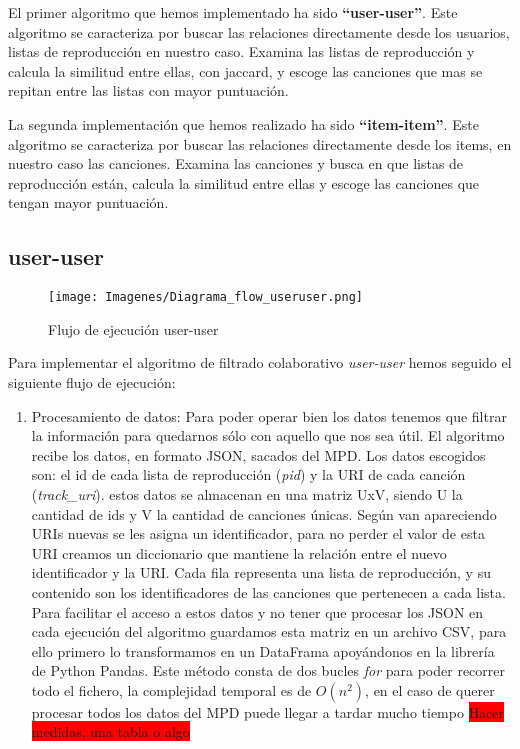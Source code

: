 \documentclass{article}
\begin{document}
\bigskip
El primer algoritmo que hemos implementado ha sido \textbf{``user-user''}. Este algoritmo se caracteriza por buscar las relaciones directamente desde los usuarios, listas de reproducción en nuestro caso. Examina las listas de reproducción y  calcula la similitud entre ellas, con jaccard, y escoge las canciones que mas se repitan entre las listas con mayor puntuación.

\bigskip
La segunda implementación que hemos realizado ha sido \textbf{``item-item''}. Este algoritmo se caracteriza por buscar las relaciones directamente desde los items, en nuestro caso las canciones. Examina las canciones y busca en que listas de reproducción están, calcula la similitud entre ellas y escoge las canciones que tengan mayor puntuación.

\bigskip

\subsection{user-user}
\begin{figure}[h!]
	\texttt{[image: Imagenes/Diagrama\_flow\_useruser.png]}
	\caption{Flujo de ejecución user-user }
	\label{fig:userxlr1}
\end{figure}
Para implementar el algoritmo de filtrado colaborativo \textit{user-user} hemos seguido el siguiente flujo de ejecución:
\begin{enumerate}
	\item Procesamiento de datos: Para poder operar bien los datos tenemos que filtrar la información para quedarnos sólo con aquello que nos sea útil. El algoritmo recibe los datos, en formato JSON, sacados del MPD. Los datos escogidos son: el id de cada lista de reproducción (\textit{pid}) y la URI de cada canción (\textit{track\_uri}). estos datos se almacenan en una matriz UxV, siendo U la cantidad de ids y V la cantidad de canciones únicas. Según van apareciendo URIs nuevas se les asigna un identificador, para no perder el valor de esta URI creamos un diccionario que mantiene la relación entre el nuevo identificador y la URI. Cada fila representa una lista de reproducción, y su contenido son los identificadores de las canciones que pertenecen a cada lista. Para facilitar el acceso a estos datos y no tener que procesar los JSON en cada ejecución del algoritmo guardamos esta matriz en un archivo CSV, para ello primero lo transformamos en un DataFrama apoyándonos en la librería de Python Pandas. Este método consta de dos bucles \textit{for} para poder recorrer todo el fichero, la complejidad temporal es de $O(n^2)$, en el caso de querer procesar todos los datos del MPD puede llegar a tardar mucho tiempo \colorbox{red}{Hacer medidas, una tabla o algo}
\end{enumerate}
\end{document}
